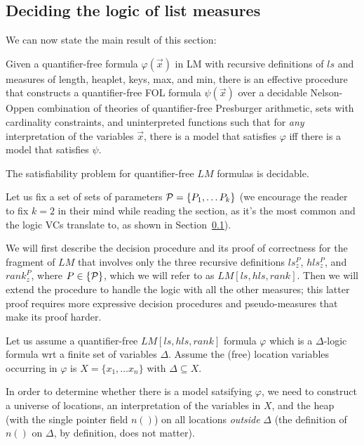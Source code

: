 \subsection{Deciding the logic of list measures}
We can now state the main result of this section:

\begin{theorem}
	Given a quantifier-free formula $\varphi(\vec{x})$ in LM with recursive definitions
	of $ls$ and measures of length, heaplet, keys, max, and min, there is
	an effective procedure that constructs a quantifier-free FOL formula $\psi(\vec{x})$ over 
	a decidable Nelson-Oppen combination of theories of quantifier-free Presburger arithmetic, 
	sets with cardinality constraints, and uninterpreted functions such that for \emph{any}
	interpretation of the variables $\vec{x}$, there is a model that satisfies $\varphi$ iff there
	is a model that satisfies $\psi$.
\end{theorem}


\begin{corollary}
	 The satisfiability problem for quantifier-free $LM$ formulas is decidable.
\end{corollary}

Let us fix a set of sets of parameters ${\cal P} = \{P_1, \ldots P_k\}$
(we encourage the reader to fix $k=2$ in their mind while reading the section, as it's the
most common and the logic VCs translate to, as shown in Section~\ref{}).

We will first describe the decision procedure and its proof of correctness for the fragment
of $LM$ that involves only the three recursive definitions $ls_z^P$, $hls_z^P$, and $rank_z^P$,
where $P \in \{\cal P\}$, which we will refer to as $LM[ls,hls,rank]$. 
Then we will extend the procedure to handle the logic with all the other measures; this latter
proof requires more expressive decision procedures and pseudo-measures that make its proof harder.

Let us assume a quantifier-free $LM[ls,hls,rank]$ formula $\varphi$ which is a $\Delta$-logic formula
wrt a finite set of variables $\Delta$.
Assume the (free) location variables occurring in $\varphi$ is $X = \{x_1, \ldots x_n\}$ with
$\Delta \subseteq X$. 

In order to determine whether there is a model satsifying $\varphi$, we need to construct a universe
of locations, an interpretation of the variables in $X$, and the heap
(with the single pointer field $n()$) on all locations \emph{outside} $\Delta$ (the definition
of $n()$ on $\Delta$, by definition, does not matter).


